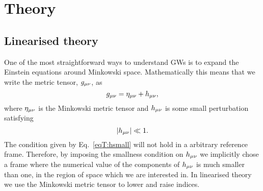

\chapter{Theory}
\section{Linearised theory}
One of the most straightforward ways to understand 
GWs is to expand the Einstein equations around 
Minkowski space. Mathematically this means that we write the
metric tensor, $g_{\mu\nu}$, as
\begin{equation} \label{eqT:metric}
g_{\mu\nu} = \eta_{\mu\nu} + h_{\mu\nu},
\end{equation}
where $\eta_{\mu\nu}$ is the Minkowski metric tensor and $h_{\mu\nu}$
is some small perturbation satisfying
\begin{equation} \label{eqT:hsmall}
|h_{\mu\nu}|  \ll 1.
\end{equation}
The condition given by Eq.~\ref{eqT:hsmall} will not hold in a arbitrary 
reference frame. Therefore, by imposing the smallness condition on $h_{\mu\nu}$
we implicitly chose a frame where the numerical value of the components of $h_{\mu\nu}$ is much smaller than one,
in the region of space which we are interested in. In linearised theory we use the Minkowski metric tensor
to lower and raise indices. 

